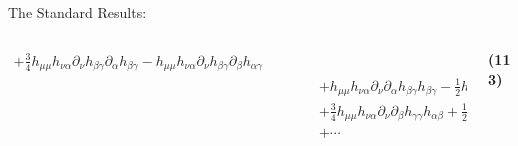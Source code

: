 \documentclass[aspectratio=169,usenames,dvipsnames]{beamer}
\begin{document}
\begin{frame}[t]{\centering {}\\ The Standard Results:}
{\begin{columns}
\begin{column}{0.85\textwidth}
\begin{alignat*}{3}
  + \frac{3}{4} h_{\mu \mu} h_{\nu \alpha} \partial_{\nu} h_{\beta \gamma} \partial_{\alpha} h_{\beta \gamma}
  - h_{\mu \mu} h_{\nu \alpha} \partial_{\nu} h_{\beta \gamma} \partial_{\beta} h_{\alpha \gamma}
\\ & && &&  + h_{\mu \mu} h_{\nu \alpha} \partial_{\nu} \partial_{\alpha} h_{\beta \gamma} h_{\beta \gamma}
  - \frac{1}{2} h_{\mu \mu} h_{\nu \alpha} \partial_{\nu} \partial_{\beta} h_{\alpha \gamma} h_{\beta \gamma}
  - h_{\mu \mu} h_{\nu \alpha} \partial_{\nu} \partial_{\beta} h_{\beta \gamma} h_{\alpha \gamma}
  \\ & && &&  + \frac{3}{4} h_{\mu \mu} h_{\nu \alpha} \partial_{\nu} \partial_{\beta} h_{\gamma \gamma} h_{\alpha \beta}
  + \frac{1}{2} h_{\mu \mu} h_{\nu \alpha} \partial_{\alpha} h_{\nu \beta} \partial_{\beta} h_{\gamma \gamma}
  - \frac{1}{2} h_{\mu \mu} h_{\nu \alpha} \partial_{\alpha} h_{\nu \beta} \partial_{\gamma} h_{\beta \gamma}
  \\ & && &&  + \cdots
\end{alignat*}    
  \end{column}
  \begin{column}{0.1\textwidth}
    \hfill {\bf{\textcolor{LUCopper}{\normalsize{(113)}}}}
    \vspace{5mm}
  \end{column}
\end{columns}}


\end{frame}
\end{document}
